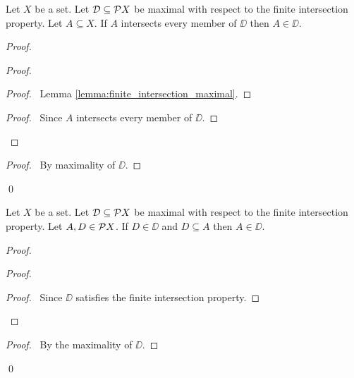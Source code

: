 \begin{lemma}
    \label{lemma:member_maximal_finite_intersection}
    Let $X$ be a set. Let $\mathcal{D} \subseteq \mathcal{P} X$ be maximal with respect to the finite intersection property.
    Let $A \subseteq X$. If $A$ intersects every member of $\DD$ then $A \in \DD$.
\end{lemma}

\begin{proof}
    \pf
    \begin{proof}
        \begin{proof}
            \pf\ Lemma \ref{lemma:finite_intersection_maximal}.
        \end{proof}
        \begin{proof}
            \pf\ Since $A$ intersects every member of $\DD$.
        \end{proof}
    \end{proof}
    \qedstep
    \begin{proof}
        \pf\ By maximality of $\DD$.
    \end{proof}
    \qed
\end{proof}

\begin{proposition}
    Let $X$ be a set. Let $\mathcal{D} \subseteq \mathcal{P} X$ be maximal with respect to the
    finite intersection property. Let $A, D \in \mathcal{P} X$.
    If $D \in \DD$ and $D \subseteq A$ then $A \in \DD$.
\end{proposition}

\begin{proof}
    \pf
    \begin{proof}
        \begin{proof}
            \pf\ Since $\DD$ satisfies the finite intersection property.
        \end{proof}
    \end{proof}
    \begin{proof}
        \pf\ By the maximality of $\DD$.
    \end{proof}
    \qed
\end{proof}